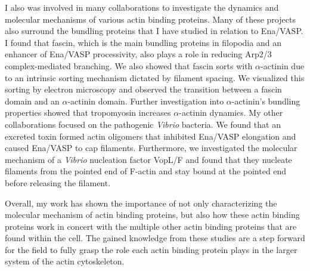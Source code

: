 I also was involved in many collaborations to investigate the dynamics and molecular mechanisms of various actin binding proteins. Many of these projects also surround the bundling proteins that I have studied in relation to Ena/VASP. I found that fascin, which is the main bundling proteins in filopodia and an enhancer of Ena/VASP processivity, also plays a role in reducing Arp2/3 complex-mediated branching. We also showed that fascin sorts with $\alpha$-actinin due to an intrinsic sorting mechanism dictated by filament spacing. We visualized this sorting by electron microscopy and observed the transition between a fascin domain and an $\alpha$-actinin domain. Further investigation into $\alpha$-actinin's bundling properties showed that tropomyosin increases $\alpha$-actinin dynamics. My other collaborations focused on the pathogenic \textit{Vibrio} bacteria. We found that an excreted toxin formed actin oligomers that inhibited Ena/VASP elongation and caused Ena/VASP to cap filaments. Furthermore, we investigated the molecular mechanism of a \textit{Vibrio} nucleation factor VopL/F and found that they nucleate filaments from the pointed end of F-actin and stay bound at the pointed end before releasing the filament. 

Overall, my work has shown the importance of not only characterizing the molecular mechanism of actin binding proteins, but also how these actin binding proteins work in concert with the multiple other actin binding proteins that are found within the cell. The gained knowledge from these studies are a step forward for the field to fully grasp the role each actin binding protein plays in the larger system of the actin cytoskeleton. 
